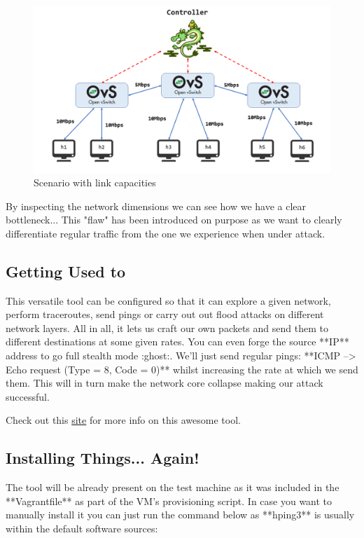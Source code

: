 \documentclass[12pt]{report}
\newcommand{\newpar} {
    \vskip 1cm
}
\begin{document}
				\begin{figure}
					\centering
					\includegraphics[scale = 1]{scenario_limits.png}
					\caption{Scenario with link capacities}
					\label{f:limited}
				\end{figure}

				By inspecting the network dimensions we can see how we have a clear bottleneck... This "flaw" has been introduced on purpose as we want to clearly differentiate regular traffic from the one we experience when under attack.

		\subsection{Getting Used to }
			This versatile tool can be configured so that it can explore a given network, perform traceroutes, send pings or carry out out flood attacks on different network layers. All in all, it lets us craft our own packets and send them to different destinations at some given rates. You can even forge the source **IP** address to go full stealth mode :ghost:. We'll just send regular pings: **ICMP --> Echo request (Type = 8, Code = 0)** whilst increasing the rate at which we send them. This will in turn make the network core collapse making our attack successful.
			\newpar
			Check out this \href{https://tools.kali.org/information-gathering/hping3}{site} for more info on this awesome tool.

		\subsection{Installing Things... Again!}
			The tool will be already present on the test machine as it was included in the **Vagrantfile** as part of the VM's provisioning script. In case you want to manually install it you can just run the command below as **hping3** is usually within the default software sources:
\end{document}
